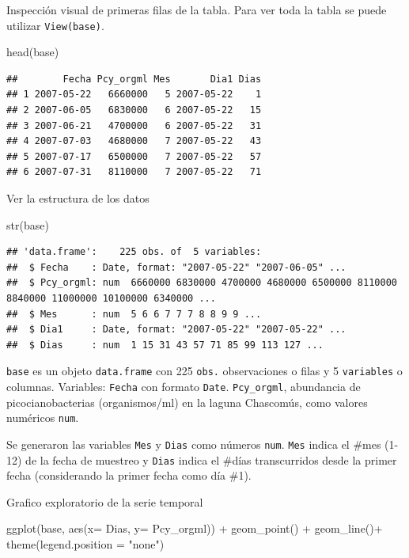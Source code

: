 \documentclass[
]{book}
\newenvironment{Shaded}{\begin{snugshade}}{\end{snugshade}}
\newcommand{\AttributeTok}[1]{\textcolor[rgb]{0.77,0.63,0.00}{#1}}
\newcommand{\FunctionTok}[1]{\textcolor[rgb]{0.00,0.00,0.00}{#1}}
\newcommand{\NormalTok}[1]{#1}
\newcommand{\SpecialCharTok}[1]{\textcolor[rgb]{0.00,0.00,0.00}{#1}}
\newcommand{\StringTok}[1]{\textcolor[rgb]{0.31,0.60,0.02}{#1}}
\begin{document}
Inspección visual de primeras filas de la tabla. Para ver toda la tabla se puede utilizar \texttt{View(base)}.

\begin{Shaded}
\begin{Highlighting}[]
\FunctionTok{head}\NormalTok{(base)}
\end{Highlighting}
\end{Shaded}

\begin{verbatim}
##        Fecha Pcy_orgml Mes       Dia1 Dias
## 1 2007-05-22   6660000   5 2007-05-22    1
## 2 2007-06-05   6830000   6 2007-05-22   15
## 3 2007-06-21   4700000   6 2007-05-22   31
## 4 2007-07-03   4680000   7 2007-05-22   43
## 5 2007-07-17   6500000   7 2007-05-22   57
## 6 2007-07-31   8110000   7 2007-05-22   71
\end{verbatim}

Ver la estructura de los datos

\begin{Shaded}
\begin{Highlighting}[]
\FunctionTok{str}\NormalTok{(base)}
\end{Highlighting}
\end{Shaded}

\begin{verbatim}
## 'data.frame':    225 obs. of  5 variables:
##  $ Fecha    : Date, format: "2007-05-22" "2007-06-05" ...
##  $ Pcy_orgml: num  6660000 6830000 4700000 4680000 6500000 8110000 8840000 11000000 10100000 6340000 ...
##  $ Mes      : num  5 6 6 7 7 7 8 8 9 9 ...
##  $ Dia1     : Date, format: "2007-05-22" "2007-05-22" ...
##  $ Dias     : num  1 15 31 43 57 71 85 99 113 127 ...
\end{verbatim}

\texttt{base} es un objeto \texttt{data.frame} con 225 \texttt{obs.} observaciones o filas y 5 \texttt{variables} o columnas.
Variables: \texttt{Fecha} con formato \texttt{Date}. \texttt{Pcy\_orgml}, abundancia de picocianobacterias (organismos/ml) en la laguna Chascomús, como valores numéricos \texttt{num}.

Se generaron las variables \texttt{Mes} y \texttt{Dias} como números \texttt{num}. \texttt{Mes} indica el \#mes (1-12) de la fecha de muestreo y \texttt{Dias} indica el \#días transcurridos desde la primer fecha (considerando la primer fecha como día \#1).

Grafico exploratorio de la serie temporal

\begin{Shaded}
\begin{Highlighting}[]
\FunctionTok{ggplot}\NormalTok{(base, }\FunctionTok{aes}\NormalTok{(}\AttributeTok{x=}\NormalTok{ Dias, }\AttributeTok{y=}\NormalTok{ Pcy\_orgml))  }\SpecialCharTok{+}
  \FunctionTok{geom\_point}\NormalTok{()  }\SpecialCharTok{+}
  \FunctionTok{geom\_line}\NormalTok{()}\SpecialCharTok{+}
  \FunctionTok{theme}\NormalTok{(}\AttributeTok{legend.position =} \StringTok{"none"}\NormalTok{)}
\end{Highlighting}
\end{Shaded}
\end{document}
